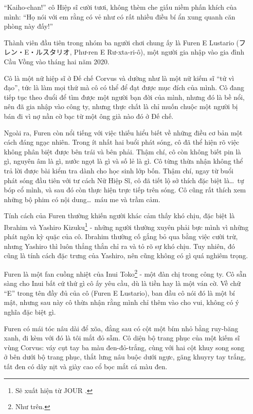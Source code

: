 \documentclass[../main.tex]{subfiles}
\begin{document}
``Kaiho-chan!'' cô Hiệp sĩ cười tươi, không thèm che giấu niềm phấn khích của mình: ``Họ nói với em rằng có vẻ như có rất nhiều điều bí ẩn xung quanh căn phòng này đấy!''

\chrint


Thành viên đầu tiên trong nhóm ba người chơi chung ấy là Furen E Lustario (フレン・{\fotskip E}・ルスタリオ, Phư-ren E Rư-xta-ri-ô), một người gia nhập vào gia đình Cầu Vồng vào tháng hai năm 2020.

Cô là một nữ hiệp sĩ ở Đế chế Corvus và dường như là một nữ kiếm sĩ ``tử vì đạo'', tức là làm mọi thứ mà cô có thể để đạt được mục đích của mình. Cô đang tiếp tục theo đuổi để tìm được một người bạn đời của mình, nhưng đó là bề nổi, nên đã gia nhập vào công ty, nhưng thực chất là chỉ muốn chuộc một người bị bán đi vì nợ nần cờ bạc từ một ông già nào đó ở Đế chế.

Ngoài ra, Furen còn nổi tiếng với việc thiếu hiểu biết về những điều cơ bản một cách đáng ngạc nhiên. Trong ít nhất hai buổi phát sóng, cô đã thể hiện rõ việc không phân biệt được bên trái và bên phải. Thậm chí, cô còn không biết pin là gì, nguyên âm là gì, nước ngọt là gì và số lẻ là gì. Cô từng thừa nhận không thể trả lời được bài kiểm tra dành cho học sinh lớp bốn. Thậm chí, ngay từ buổi phát sóng đầu tiên với tư cách Nữ Hiệp Sĩ, cô đã tiết lộ sở thích đặc biệt là\dots\ tự bóp cổ mình, và sau đó còn thực hiện trực tiếp trên sóng. Cô cũng rất thích xem những bộ phim có nội dung\dots\ máu me và trầm cảm.

Tính cách của Furen thường khiến người khác cảm thấy khó chịu, đặc biệt là Ibrahim và Yashiro Kizuku\footnote{Sẽ xuất hiện từ {\flaregothic JOUR }.} - những người thường xuyên phải bực mình vì những phát ngôn kỳ quặc của cô. Ibrahim thường cố gắng bỏ qua bằng việc cười trừ, nhưng Yashiro thì luôn thẳng thắn chỉ ra và tỏ rõ sự khó chịu. Tuy nhiên, đó cũng là tính cách đặc trưng của Yashiro, nên cũng không có gì quá nghiêm trọng.

Furen là một fan cuồng nhiệt của Inui Toko\footnote{Như trên.} - một đàn chị trong công ty. Cô sẵn sàng cho Inui bất cứ thứ gì cô ấy yêu cầu, dù là tiền hay là một ván cờ. Về chữ ``E'' trong tên đầy đủ của cô (Furen E Lustario), ban đầu cô nói đó là một bí mật, nhưng sau này cô thừa nhận rằng mình chỉ thêm vào cho vui, không có ý nghĩa đặc biệt gì.

Furen có mái tóc nâu dài để xõa, đằng sau có cột một bím nhỏ bằng ruy-băng xanh, đi kèm với đó là tôi mắt đỏ sẫm. Cô diện bộ trang phục của một kiếm sĩ vùng Corvus: váy cụt tay ba màu đen-đỏ-trắng, cùng với hai cột khuy song song ở bên dưới bộ trang phục, thắt lưng nâu buộc dưới ngực, găng khuyry tay trắng, tất đen có dây nịt và giày cao cổ bọc mắt cá màu đen.
\end{document}
